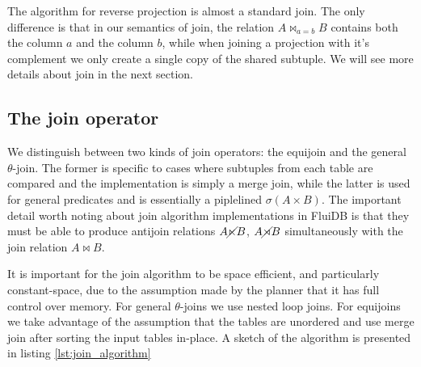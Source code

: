 The algorithm for reverse projection is almost a standard join. The
only difference is that in our semantics of join, the relation \(A
\Join_{a = b} B\) contains both the column \(a\) and the column \(b\),
while when joining a projection with it's complement we only create a
single copy of the shared subtuple. We will see more details about
join in the next section.

\subsection{The join operator}

We distinguish between two kinds of join operators: the equijoin and
the general \(\theta\)-join. The former is specific to cases where
subtuples from each table are compared and the implementation is
simply a merge join, while the latter is used for general predicates
and is essentially a piplelined \(\sigma(A \times B)\). The important
detail worth noting about join algorithm implementations in FluiDB is
that they must be able to produce antijoin relations \(A \cancel\ltimes B\),
\(A \cancel\rtimes B\) simultaneously with the join relation \(A \Join B\).

It is important for the join algorithm to be space efficient, and particularly
constant-space, due to the assumption made by the planner that it has full
control over memory. For general \(\theta\)-joins we use nested loop
joins. For equijoins we take advantage of the assumption that the
tables are unordered and use merge join after sorting the input tables
in-place. A sketch of the algorithm is presented in listing
\ref{lst:join_algorithm}

